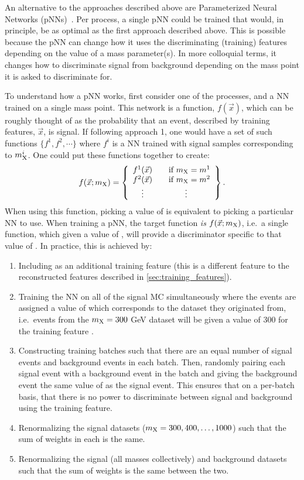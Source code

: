 An alternative to the approaches described above are Parameterized Neural Networks (pNNs)~\cite{Baldi:2016fzo}. Per process, a single pNN could be trained that would, in principle, be as optimal as the first approach described above. This is possible because the pNN can change how it uses the discriminating (training) features depending on the value of a mass parameter(s). In more colloquial terms, it changes how to discriminate signal from background depending on the mass point it is asked to discriminate for.

To understand how a pNN works, first consider one of the \XHH processes, and a NN trained on a single mass point. This network is a function, $f(\vec{x})$, which can be roughly thought of as the probability that an event, described by training features, $\vec{x}$, is signal. If following approach 1, one would have a set of such functions $\{f^1, f^2,\cdots\}$ where $f^i$ is a NN trained with signal samples corresponding to $m_{\mathrm{X}}^i$. One could put these functions together to create: 
\begin{equation}
f(\vec{x}; m_{\mathrm{X}}) = 
\left\{ 
  \begin{array}{ c l }
    f^1(\vec{x}) & \quad \textrm{if } m_{\mathrm{X}}=m^1 \\
    f^2(\vec{x}) & \quad \textrm{if } m_{\mathrm{X}}=m^2 \\
    \vdots & \quad \quad \quad \vdots 
  \end{array}
\right\}.\label{eqn:combined_fx}
\end{equation}
When using this function, picking a value of \mX is equivalent to picking a particular NN to use. When training a pNN, the target function \textit{is} $f(\vec{x}; m_{\mathrm{X}})$, i.e.\ a single function, which given a value of \mX, will provide a discriminator specific to that value of \mX. In practice, this is achieved by:
\begin{enumerate}
    \item Including \mX as an additional training feature (this is a different feature to the reconstructed \mX features described in \cref{sec:training_features}).
    \item Training the NN on all of the signal MC simultaneously where the events are assigned a value of \mX which corresponds to the dataset they originated from, i.e.\ events from the $m_{\mathrm{X}}=300$ GeV dataset will be given a value of 300 for the training feature \mX. 
    \item Constructing training batches such that there are an equal number of signal events and background events in each batch. Then, randomly pairing each signal event with a background event in the batch and giving the background event the same value of \mX as the signal event. This ensures that on a per-batch basis, that there is no power to discriminate between signal and background using the \mX training feature.
    \item Renormalizing the signal datasets ($m_{\mathrm{X}}=300,400,\ldots,1000$\GeV) such that the sum of weights in each is the same.
    \item Renormalizing the signal (all masses collectively) and background datasets such that the sum of weights is the same between the two.
\end{enumerate}
